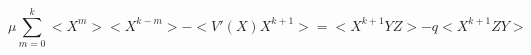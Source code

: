 \begin{equation}\label{eq:flip1}
\mu \sum_{m=0}^k
<X^m><X^{k-m}> - <V'(X) X^{k+1}> = <X^{k+1} YZ> -  q<X^{k+1} ZY>
\end{equation}


